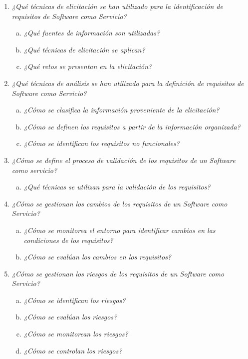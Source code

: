 \documentclass{article}
\begin{document}
\begin{enumerate}[P 1.-]
  \item\emph{¿Qué técnicas de elicitación se han utilizado para la identificación de requisitos de Software como Servicio? }
  \begin{enumerate}[(a)]
  \item \emph{¿Qué fuentes de información son utilizadas?}
  \item \emph{¿Qué técnicas de elicitación se aplican?}
  \item \emph{¿Qué retos se presentan en la elicitación?}
  \end{enumerate}
  
  \item\emph{¿Qué técnicas de análisis se han utilizado para la definición de requisitos de Software como Servicio?}
  \begin{enumerate}[(a)]
  \item \emph{¿Cómo se clasifica la información proveniente de la elicitación?}
  \item \emph{¿Cómo se definen los requisitos a partir de la información organizada?}
  \item \emph{¿Cómo se identifican los requisitos no funcionales?}
  \end{enumerate}

  \item\emph{¿Cómo se define el proceso de validación de los requisitos de un Software como servicio?}
  \begin{enumerate}[(a)]
  \item \emph{¿Qué técnicas se utilizan para la validación de los requisitos? }
  \end{enumerate}

  \item\emph{¿Cómo se gestionan los cambios de los requisitos de un Software como Servicio?}
  \begin{enumerate}[(a)]
  \item \emph{¿Cómo se monitorea el entorno para identificar cambios en las condiciones de los requisitos?}
  \item \emph{¿Cómo se evalúan los cambios en los requisitos?}
  \end{enumerate}
            
  \item\emph{¿Cómo se gestionan los riesgos de los requisitos de un Software como Servicio?}
  \begin{enumerate}[(a)]
  \item \emph{¿Cómo se identifican los riesgos?}
  \item \emph{¿Cómo se evalúan los riesgos?}
  \item \emph{¿Cómo se monitorean los riesgos?}
  \item \emph{¿Cómo se controlan los riesgos?}
  \end{enumerate}
  

\end{enumerate}
\end{document}
